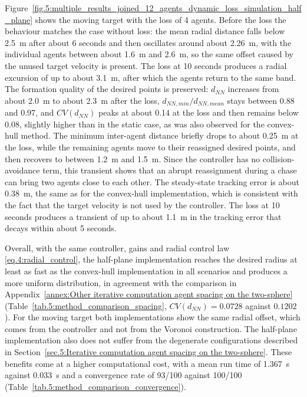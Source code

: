 Figure~\ref{fig.5:multiple_results_joined_12_agents_dynamic_loss_simulation_half_plane} shows the moving target with the loss of 4 agents. Before the loss the behaviour matches the case without loss: the mean radial distance falls below 2.5~m after about 6 seconds and then oscillates around about 2.26~m, with the individual agents between about 1.6~m and 2.6~m, so the same offset caused by the unused target velocity is present. The loss at 10 seconds produces a radial excursion of up to about 3.1~m, after which the agents return to the same band. The formation quality of the desired points is preserved: $d_{NN}$ increases from about 2.0~m to about 2.3~m after the loss, $d_{NN,min}/d_{NN,mean}$ stays between 0.88 and 0.97, and $CV(d_{NN})$ peaks at about 0.14 at the loss and then remains below 0.08, slightly higher than in the static case, as was also observed for the convex-hull method. The minimum inter-agent distance briefly drops to about 0.25~m at the loss, while the remaining agents move to their reassigned desired points, and then recovers to between 1.2~m and 1.5~m. Since the controller has no collision-avoidance term, this transient shows that an abrupt reassignment during a chase can bring two agents close to each other. The steady-state tracking error is about 0.38~m, the same as for the convex-hull implementation, which is consistent with the fact that the target velocity is not used by the controller. The loss at 10 seconds produces a transient of up to about 1.1~m in the tracking error that decays within about 5 seconds.

Overall, with the same controller, gains and radial control law \eqref{eq.4:radial_control}, the half-plane implementation reaches the desired radius at least as fast as the convex-hull implementation in all scenarios and produces a more uniform distribution, in agreement with the comparison in Appendix~\ref{annex:Other iterative computation agent spacing on the two-sphere} (Table~\ref{tab.5:method_comparison_spacing}, $CV(d_{NN}) = 0.0728$ against $0.1202$). For the moving target both implementations show the same radial offset, which comes from the controller and not from the Voronoi construction. The half-plane implementation also does not suffer from the degenerate configurations described in Section~\ref{sec.5:Iterative computation agent spacing on the two-sphere}. These benefits come at a higher computational cost, with a mean run time of 1.367~s against 0.033~s and a convergence rate of 93/100 against 100/100 (Table~\ref{tab.5:method_comparison_convergence}).
